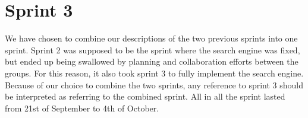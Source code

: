 \chapter{Sprint 3}
We have chosen to combine our descriptions of the two previous sprints into one sprint. Sprint 2 was supposed to be the sprint where the search engine was fixed, but ended up being swallowed by planning and collaboration efforts between the \knox{} groups. For this reason, it also took sprint 3 to fully implement the search engine. Because of our choice to combine the two sprints, any reference to sprint 3 should be interpreted as referring to the combined sprint.
All in all the sprint lasted from 21st of September to 4th of October. 






